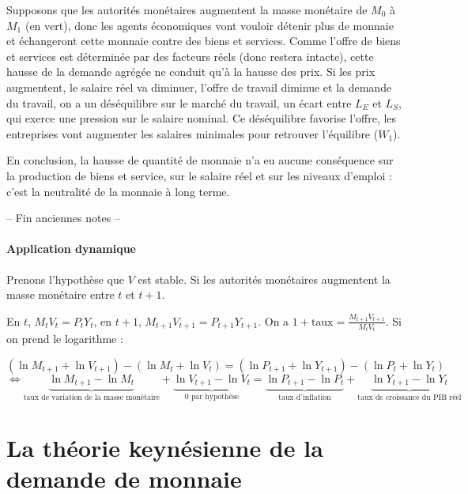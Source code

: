 	Supposons que les autorités monétaires augmentent la masse monétaire de $M_0$ à $M_1$ (en vert), donc les agents économiques vont vouloir détenir plus de monnaie et échangeront cette monnaie contre des biens et services. Comme l'offre de biens et services est déterminée par des facteurs réels (donc restera intacte), cette hausse de la demande agrégée ne conduit qu'à la hausse des prix. Si les prix augmentent, le salaire réel va diminuer, l'offre de travail diminue et la demande du travail, on a un déséquilibre sur le marché du travail, un écart entre $L_E$ et $L_S$, qui exerce une pression sur le salaire nominal. Ce déséquilibre favorise l'offre, les entreprises vont augmenter les salaires minimales pour retrouver l'équilibre ($W_1$).
	
	En conclusion, la hausse de quantité de monnaie n'a eu aucune conséquence sur la production de biens et service, sur le salaire réel et sur les niveaux d'emploi : c'est la neutralité de la monnaie à long terme.
	
	\bigbreak
	\begin{center}
	-- Fin anciennes notes --
	\end{center}
	
	\bigbreak
		
	\paragraph{Application dynamique}
	Prenons l'hypothèse que $V$ est stable. Si les autorités monétaires augmentent la masse monétaire entre $t$ et $t + 1$.
	
	En $t$, $M_t V_t = P_t Y_t$, en $t + 1$, $M_{t + 1} V_{t + 1} = P_{t + 1} Y_{t + 1}$. On a $1 + \text{taux} = \frac{M_{t + 1} V_{t + 1}}{M_t V_t}$. Si on prend le logarithme :
	
	$$(\ln M_{t + 1} + \ln V_{t + 1}) - (\ln M_t + \ln V_t) = (\ln P_{t + 1} + \ln Y_{t + 1}) - (\ln P_t + \ln Y_t)$$
	$$\Leftrightarrow \underbrace{\ln M_{t + 1} - \ln M_t}_{\text{taux de variation de la masse monétaire}} + \underbrace{\ln V_{t + 1} - \ln V_t}_{0\text{ par hypothèse}} = \underbrace{\ln P_{t + 1} -\ln P_t}_{\text{taux d'inflation}} + \underbrace{\ln Y_{t + 1} - \ln Y_t}_{\text{taux de croissance du PIB réel}}$$


\section{La théorie keynésienne de la demande de monnaie}

